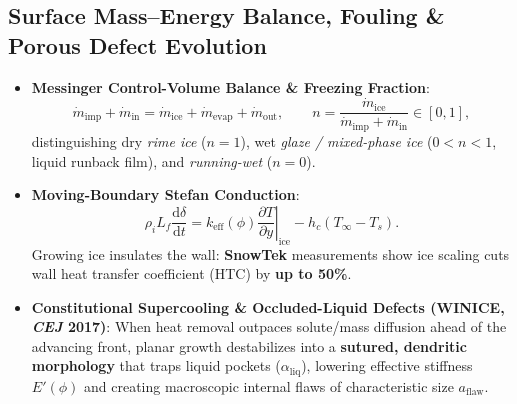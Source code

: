 \documentclass[11pt,a4paper]{article}
\newcommand{\dd}{\mathrm{d}}
\newcommand{\pd}[2]{\frac{\partial #1}{\partial #2}}
\newcommand{\td}[2]{\frac{\dd #1}{\dd #2}}
\begin{document}
\subsection{Surface Mass--Energy Balance, Fouling \& Porous Defect Evolution}
\begin{itemize}[leftmargin=1.5em,itemsep=3pt]
  \item \textbf{Messinger Control-Volume Balance \& Freezing Fraction}:
  \begin{equation}
    \dot{m}_{\text{imp}} + \dot{m}_{\text{in}} = \dot{m}_{\text{ice}} + \dot{m}_{\text{evap}} + \dot{m}_{\text{out}},
    \qquad
    n = \frac{\dot{m}_{\text{ice}}}{\dot{m}_{\text{imp}} + \dot{m}_{\text{in}}} \in [0, 1],
  \end{equation}
  distinguishing dry \emph{rime ice} ($n = 1$), wet \emph{glaze / mixed-phase ice} ($0 < n < 1$, liquid runback film), and \emph{running-wet} ($n = 0$).
  \item \textbf{Moving-Boundary Stefan Conduction}:
  \begin{equation}
    \rho_i L_f \td{\delta}{t} = k_{\text{eff}}(\phi)\left.\pd{T}{y}\right|_{\text{ice}} - h_c(T_\infty - T_s).
  \end{equation}
  Growing ice insulates the wall: \textbf{SnowTek} measurements show ice scaling cuts wall heat transfer coefficient (HTC) by \textbf{up to 50\%}.
  \item \textbf{Constitutional Supercooling \& Occluded-Liquid Defects (WINICE, \emph{CEJ} 2017)}: When heat removal outpaces solute/mass diffusion ahead of the advancing front, planar growth destabilizes into a \textbf{sutured, dendritic morphology} that traps liquid pockets ($\alpha_{\text{liq}}$), lowering effective stiffness $E'(\phi)$ and creating macroscopic internal flaws of characteristic size $a_{\text{flaw}}$.
\end{itemize}
\end{document}
